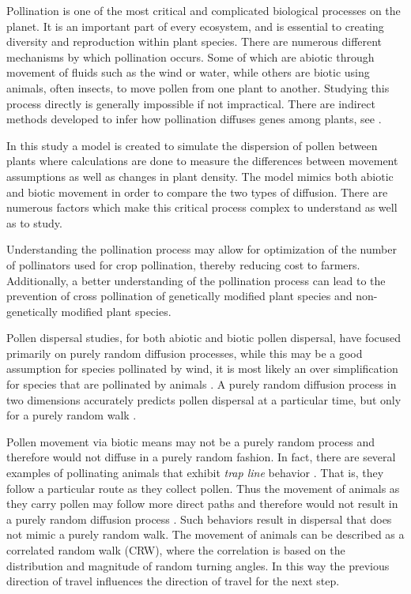 Pollination is one of the most critical and complicated biological processes on the planet.  It is
an important part of every ecosystem, and is essential to creating diversity and reproduction within
plant species.  There are numerous different mechanisms by which pollination occurs.  Some of which
are abiotic through movement of fluids such as the wind or water, while others are biotic using
animals, often insects, to move pollen from one plant to another.  Studying this process directly is
generally impossible if not impractical.  There are indirect methods developed to infer how
pollination diffuses genes among plants, see .  

In this study a model is created to simulate the dispersion of pollen between plants where
calculations are done to measure the differences between movement assumptions as well as changes in
plant density.  The model mimics both abiotic and biotic movement in order to compare the two types
of diffusion.  There are numerous factors which make this critical process complex to understand as
well as to study.

Understanding the pollination process may allow for optimization of the number of pollinators used
for crop pollination, thereby reducing cost to farmers. Additionally, a better understanding of the
pollination process can lead to the prevention of cross pollination of genetically modified plant
species and non-genetically modified plant species.

Pollen dispersal studies, for both abiotic and biotic pollen dispersal, have focused primarily on
purely random diffusion processes, while this may be a good assumption for species pollinated by
wind, it is most likely an over simplification for species that are pollinated by animals
\cite{Chan}. A purely random diffusion process in two dimensions accurately predicts pollen
dispersal at a particular time, but only for a purely random walk \cite{Byers01}.

Pollen movement via biotic means may not be a purely random process and therefore would not diffuse
in a purely random fashion. In fact, there are several examples of pollinating animals that exhibit
\emph{trap line} behavior \cite{Chan}. That is, they follow a particular route as they collect
pollen.  Thus the movement of animals as they carry pollen may follow more direct paths and
therefore would not result in a purely random diffusion process \cite{Cresswell03}. Such behaviors
result in dispersal that does not mimic a purely random walk. The movement of animals can be
described as a correlated random walk (CRW), where the correlation is based on the distribution and
magnitude of random turning angles. In this way the previous direction of travel influences the
direction of travel for the next step.

